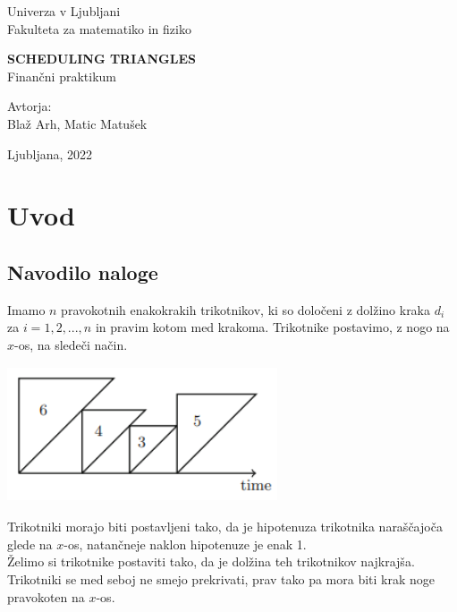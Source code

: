 \documentclass[a4paper,12pt]{article}
\theoremstyle{definition}
\theoremstyle{plain}
\begin{document}
\thispagestyle{empty}
\begin{center}
\begin{minipage}{0.75\linewidth}
    \centering
    {\Large Univerza v Ljubljani \\ Fakulteta za matematiko in fiziko}
    \\
    \vspace{7cm}

    {\uppercase{\Large \textbf{Scheduling triangles}}} \\ Finančni praktikum \\
    \vspace{5cm}

    Avtorja:\\
    { Blaž Arh, Matic Matušek}
    \vspace{5cm}

    {\Large Ljubljana, 2022}
\end{minipage}
\end{center}


\newpage
\tableofcontents
\newpage



\section{Uvod}
\subsection{Navodilo naloge}

Imamo $n$ pravokotnih enakokrakih trikotnikov, ki so določeni z dolžino kraka $d_i$ za $i=1,2,...,n$  in pravim kotom med krakoma.
Trikotnike postavimo, z nogo na $x$-os, na sledeči način.
\begin{center}
   \includegraphics[width=8cm, height=4cm]{primer_trikotnikov.png} 
\end{center}

Trikotniki morajo biti postavljeni tako, da je hipotenuza trikotnika naraščajoča glede na $x$-os, natančneje naklon hipotenuze je enak 1. \\
Želimo si trikotnike postaviti tako, da je dolžina teh trikotnikov najkrajša. Trikotniki se med seboj ne smejo prekrivati,
prav tako pa mora biti krak noge pravokoten na $x$-os.
\end{document}
